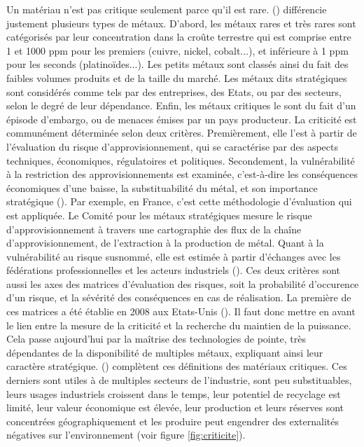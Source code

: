 Un matériau n'est pas critique seulement parce qu'il est rare. (\cite{geldron_lepuisement_2017}) différencie justement plusieurs types de métaux. D'abord, les métaux rares et très rares sont catégorisés par leur concentration dans la croûte terrestre qui est comprise entre 1 et 1000 ppm pour les premiers (cuivre, nickel, cobalt...), et inférieure à 1 ppm pour les seconds (platinoïdes...). Les petits métaux sont classés ainsi du fait des faibles volumes produits et de la taille du marché. Les métaux dits stratégiques sont considérés comme tels par des entreprises, des Etats, ou par des secteurs, selon le degré de leur dépendance. Enfin, les métaux critiques le sont du fait d'un épisode d'embargo, ou de menaces émises par un pays producteur.
\smallbreak
La criticité est communément déterminée selon deux critères. Premièrement, elle l'est à partir de l'évaluation du risque d'approvisionnement, qui se caractérise par des aspects techniques, économiques, régulatoires et politiques. Secondement, la vulnérabilité à la restriction des approvisionnements est examinée, c'est-à-dire les conséquences économiques d'une baisse, la substituabilité du métal, et son importance stratégique (\cite{hatayama_adopting_2018}). Par exemple, en France, c'est cette méthodologie d'évaluation qui est appliquée. Le Comité pour les métaux stratégiques mesure le risque d'approvisionnement à travers une cartographie des flux de la chaîne d'approvisionnement, de l'extraction à la production de métal. Quant à la vulnérabilité au risque susnommé, elle est estimée à partir d'échanges avec les fédérations professionnelles et les acteurs industriels (\cite{comes_note_2018}). 
\smallbreak
Ces deux critères sont aussi les axes des matrices d'évaluation des risques, soit la probabilité d'occurence d'un risque, et la sévérité des conséquences en cas de réalisation. La première de ces matrices a été établie en 2008 aux Etats-Unis (\cite{hache_vers_2019}). Il faut donc mettre en avant le lien entre la mesure de la criticité et la recherche du maintien de la puissance. Cela passe aujourd'hui par la maîtrise des technologies de pointe, très dépendantes de la disponibilité de multiples métaux, expliquant ainsi leur caractère stratégique.
\smallbreak
(\cite{hache_vers_2019}) complètent ces définitions des matériaux critiques. Ces derniers sont utiles à de multiples secteurs de l'industrie, sont peu substituables, leurs usages industriels croissent dans le temps, leur potentiel de recyclage est limité, leur valeur économique est élevée, leur production et leurs réserves sont concentrées géographiquement et les produire peut engendrer des externalités négatives sur l'environnement (voir figure \ref{fig:criticite}).
